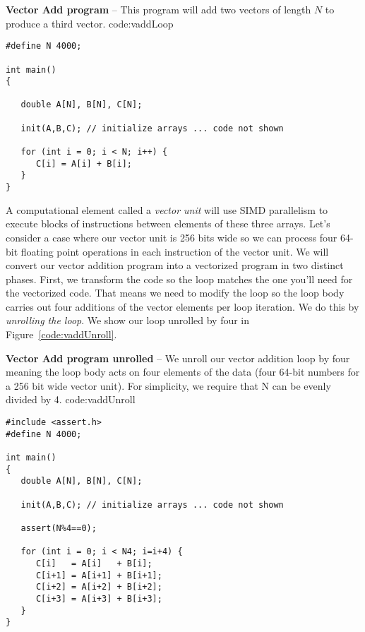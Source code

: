 \begin{CodeExample}%
{\textbf{Vector Add program} -- \small This program will add two vectors of length $N$
to produce a third vector.
}%
{code:vaddLoop}
\begin{lstlisting}
#define N 4000;

int main()
{

   double A[N], B[N], C[N];
     
   init(A,B,C); // initialize arrays ... code not shown
   
   for (int i = 0; i < N; i++) {
      C[i] = A[i] + B[i];
   }
}	  
\end{lstlisting}
\end{CodeExample}


A computational element called a \emph{vector unit}
will use SIMD parallelism to execute blocks of instructions between elements of these three arrays.  
Let's consider a case where our vector unit is 256 bits
wide so we can process four 64-bit floating point operations in each instruction of the vector unit.  
We will convert our vector addition program into a vectorized program in two distinct phases. First, 
we transform the code so the loop matches the one you'll
need for the vectorized code.   That means we need to 
modify the loop so the loop body carries out four additions of the vector elements per loop iteration.
We do this by \emph{unrolling the loop}.  We show our loop unrolled by four in Figure~\ref{code:vaddUnroll}.  

\begin{CodeExample}%
{\textbf{Vector Add program unrolled} -- \small We unroll our vector addition loop by four meaning
the loop body acts on four elements of the data (four 64-bit numbers for a 256 bit wide vector unit).   For 
simplicity, we require that N can be evenly divided by 4.
}%
{code:vaddUnroll}
\begin{lstlisting}
#include <assert.h>
#define N 4000;

int main()
{
   double A[N], B[N], C[N];
   
   init(A,B,C); // initialize arrays ... code not shown
   
   assert(N%4==0);

   for (int i = 0; i < N4; i=i+4) {
      C[i]   = A[i]   + B[i];
      C[i+1] = A[i+1] + B[i+1];
      C[i+2] = A[i+2] + B[i+2];
      C[i+3] = A[i+3] + B[i+3];   
   }
}	  
\end{lstlisting}
\end{CodeExample}

